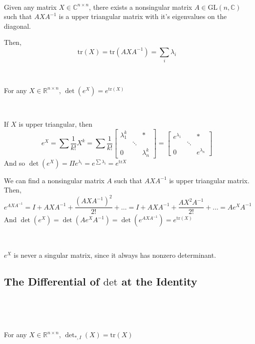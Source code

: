 \documentclass{article}
\begin{document}
\begin{customproof}
  \

  Given any matrix $X \in \mathbb{\mathbb{C}}^{n \times n}$, there exists a nonsingular matrix $A \in \text{GL}(n, \mathbb{C})$ such that $AXA ^{-1}$ is a upper triangular matrix with it's eigenvalues on the diagonal.

  Then, $$\text{tr}(X) = \text{tr}(AXA ^{-1}) = \sum_i \lambda_i$$
\end{customproof}

\begin{proposition}
  \

  For any $X \in \mathbb{R}^{n \times n}$, $\det(e^X) = e^{\text{tr}(X)}$
\end{proposition}

\begin{customproof}
  \

  If $X$ is upper triangular, then $$e^X = \sum \frac{1}{k!} X^k = \sum \frac{1}{k!}
  \begin{bmatrix}
    \lambda_1^k & & *\\
    & \ddots & \\
    0 & & \lambda_n^k
  \end{bmatrix} =
  \begin{bmatrix}
    e^{\lambda_1} & & *\\
    & \ddots & \\
    0 & & e^{\lambda_n}
  \end{bmatrix}$$And so $\det(e^X) = \Pi e^{\lambda_i} = e^{\sum \lambda_i} = e^{\text{tr} X}$

  We can find a nonsingular matrix $A$ such that $AXA ^{-1}$ is upper triangular matrix. Then, $$e^{AXA ^{-1}} = I + AXA ^{-1} + \frac{(AXA ^{-1})^2}{2!} + \dots = I + AXA ^{-1} + \frac{AX^2A ^{-1}}{2!} + \dots = Ae^XA ^{-1}$$And $\det(e^X) = \det(Ae^XA ^{-1}) = \det(e^{AXA ^{-1}}) = e^{\text{tr}(X)}$
\end{customproof}

\begin{corollary}
  \

  $e^X$ is never a singular matrix, since it always has nonzero determinant.
\end{corollary}

\subsection{The Differential of $\text{det}$ at the Identity}
\

\begin{proposition}
  \

  For any $X \in \mathbb{R}^{n \times n}$, $\det_{*, I}(X) = \text{tr}(X)$
\end{proposition}
\end{document}

